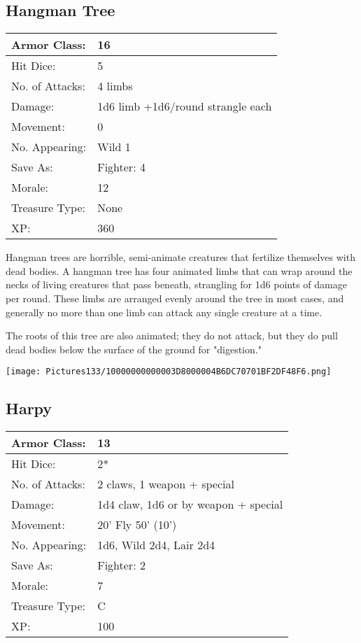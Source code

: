 \documentclass[a4paper,twoside,openany,10pt]{book}
\begin{document}
\begin{multicols}{2}
\subsection*{Hangman Tree}\label{hangman-tree}

\begin{tabularx}{0.48\textwidth}{@{}lX@{}}
Armor Class: & 16 \\\hline
Hit Dice: & 5 \\\hline
No. of Attacks: & 4 limbs \\\hline
Damage: & 1d6 limb +1d6/round strangle each \\\hline
Movement: & 0 \\\hline
No. Appearing: & Wild 1 \\\hline
Save As: & Fighter: 4 \\\hline
Morale: & 12 \\\hline
Treasure Type: & None \\\hline
XP: & 360 \\\hline
\end{tabularx}\medskip

Hangman trees are horrible, semi-animate creatures that fertilize themselves with dead bodies. A hangman tree has four animated limbs that can wrap around the necks of living creatures that pass beneath, strangling for 1d6 points of damage per round. These limbs are arranged evenly around the tree in most cases, and generally no more than one limb can attack any single creature at a time.

The roots of this tree are also animated; they do not attack, but they do pull dead bodies below the surface of the ground for "digestion."

\begin{center}
	\texttt{[image: Pictures133/10000000000003D8000004B6DC70701BF2DF48F6.png]}
\end{center}

\subsection*{Harpy}\label{harpy}

\begin{tabularx}{0.48\textwidth}{@{}lX@{}}
Armor Class: & 13 \\\hline
Hit Dice: & 2* \\\hline
No. of Attacks: & 2 claws, 1 weapon + special \\\hline
Damage: & 1d4 claw, 1d6 or by weapon + special \\\hline
Movement: & 20' Fly 50'
(10') \\\hline
No. Appearing: & 1d6, Wild 2d4, Lair 2d4 \\\hline
Save As: & Fighter: 2 \\\hline
Morale: & 7 \\\hline
Treasure Type: & C \\\hline
XP: & 100 \\\hline
\end{tabularx}\medskip


\end{multicols}
\end{document}
